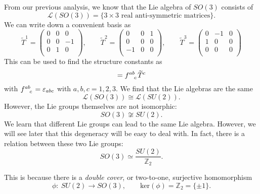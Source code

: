 \begin{example}[G = SO(3)]
  From our previous analysis, we know that the Lie algebra of $SO(3)$ consists of
  \begin{equation}
    \mathscr{L}(SO(3)) = \{ 3 \times 3 \text{ real anti-symmetric matrices} \}.
  \end{equation}
  We can write down a convenient basis as
  \begin{equation}
    \widetilde T^1 = 
    \begin{pmatrix}
     0 & 0 & 0 \\
     0 & 0 & -1 \\
     0 & 1 & 0 \\
    \end{pmatrix},
    \qquad
    \widetilde T^2 = 
    \begin{pmatrix}
     0 & 0 & 1 \\
     0 & 0 & 0 \\
     -1 & 0 & 0 \\
    \end{pmatrix},
    \qquad
    \widetilde T^3 = 
    \begin{pmatrix}
     0 & -1 & 0 \\
     1 & 0 & 0 \\
     0 & 0 & 0 \\
    \end{pmatrix}
  \end{equation}
  This can be used to find the structure constants as
  \begin{equation}
    [\widetilde T^a, \widetilde T^b] = f \indices{^{ab}_c} \widetilde T^c
  \end{equation}
  with $f \indices{^{ab}_c} = \varepsilon_{abc}$ with $a,b,c = 1,2,3$.
  We find that the Lie algebras are the same
  \begin{equation}
    \mathscr{L}(SO(3)) \cong \mathscr{L}(SU(2)).
  \end{equation}
  However, the Lie groups themselves are not isomorphic: 
  \begin{equation}
    SO(3) \not\cong SU(2).
  \end{equation}
  We learn that different Lie groups can lead to the same Lie algebra. However, we will see later that this degeneracy will be easy to deal with.
  In fact, there is a relation between these two Lie groups:
  \begin{equation}
    SO(3) \simeq \frac{SU(2)}{\mathbb{Z}_2}.
  \end{equation}
  \begin{leftbar}
    \begin{remark}
      This is because there is a \emph{double cover}, or two-to-one, surjective homomorphism
      \begin{equation}
	\phi\colon \ SU(2) \to SO(3), \qquad \text{ker}(\phi) = \mathbb{Z}_2 = \{\pm 1\}.
      \end{equation}
    \end{remark}
  \end{leftbar}
\end{example}


